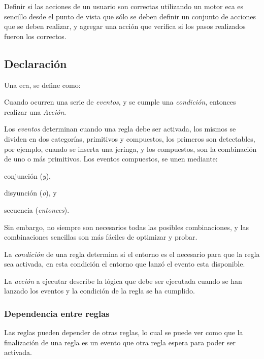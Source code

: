 Definir si las acciones de un usuario son correctas utilizando un motor
\gls{eca} es sencillo desde el punto de vista que sólo se deben definir un
conjunto de acciones que se deben realizar, y agregar una acción que verifica si
los pasos realizados fueron los correctos.

\subsection{Declaración}

Una \gls{eca}, se define como\cite{bailey2004event}\cite{behrends2006combining}:

\begin{center}
	 Cuando ocurren una serie de \emph{eventos}, y se cumple una
	 \emph{condición}, entonces realizar una \emph{Acción}.
\end{center}

Los \emph{eventos} determinan cuando una regla debe ser activada, los mismos se
dividen en dos categorías\cite{behrends2006combining}, primitivos y compuestos,
los primeros son detectables, por ejemplo, cuando se inserta una jeringa, y los
compuestos, son la combinación de uno o más
primitivos\cite{bailey2004event}\cite{behrends2006combining}. Los eventos
compuestos, se unen mediante:
\begin{enumerate*}[label=\itshape\alph*\upshape)]
\item conjunción (\emph{y}),
\item disyunción (\emph{o}), y
\item secuencia (\emph{entonces}).
\end{enumerate*}
Sin embargo, no siempre son necesarios todas las posibles combinaciones, y las
combinaciones sencillas son más fáciles de optimizar y
probar\cite{bailey2004event}.

La \emph{condición} de una regla determina si el entorno es el necesario para que la
regla sea activada, en esta condición el entorno que lanzó el evento esta
disponible.

La \emph{acción} a ejecutar describe la lógica que debe ser ejecutada cuando se han
lanzado los eventos y la condición de la regla se ha cumplido.

\subsubsection{Dependencia entre reglas}

Las reglas pueden depender de otras reglas, lo cual se puede ver como que la
finalización de una regla es un evento que otra regla espera para poder ser
activada.

